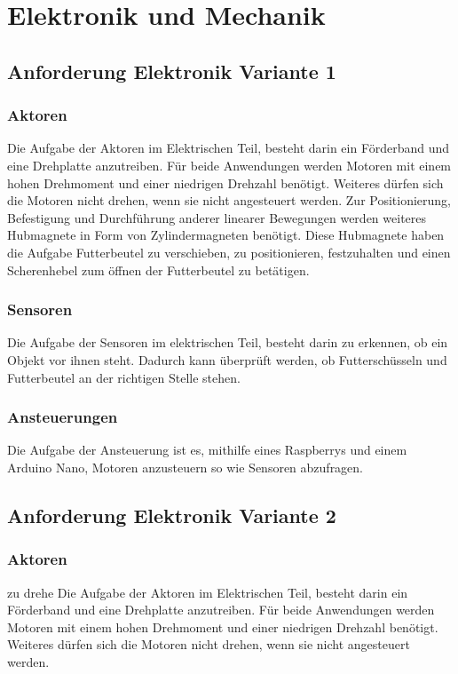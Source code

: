 \chapter{Elektronik und Mechanik}
\label{sec:elektronik-und-mechanik}

\section{Anforderung Elektronik Variante 1}
\subsection{Aktoren}
Die Aufgabe der Aktoren im Elektrischen Teil, besteht darin ein Förderband und eine Drehplatte anzutreiben. Für beide Anwendungen werden Motoren mit einem hohen Drehmoment und einer niedrigen Drehzahl benötigt. Weiteres dürfen sich die Motoren nicht drehen, wenn sie nicht angesteuert werden.
Zur Positionierung, Befestigung und Durchführung anderer linearer Bewegungen werden weiteres Hubmagnete in Form von Zylindermagneten benötigt. Diese Hubmagnete haben die Aufgabe Futterbeutel zu verschieben, zu positionieren, festzuhalten und einen Scherenhebel zum öffnen der Futterbeutel zu betätigen.  
\subsection{Sensoren}
Die Aufgabe der Sensoren im elektrischen Teil, besteht darin zu erkennen, ob ein Objekt vor ihnen steht. Dadurch kann überprüft werden, ob Futterschüsseln und Futterbeutel an der richtigen Stelle stehen.
\subsection{Ansteuerungen}
Die Aufgabe der Ansteuerung ist es, mithilfe eines Raspberrys und einem Arduino Nano, Motoren anzusteuern so wie Sensoren abzufragen. 

\section{Anforderung Elektronik Variante 2}
\subsection{Aktoren}zu drehe
Die Aufgabe der Aktoren im Elektrischen Teil, besteht darin ein Förderband und eine Drehplatte anzutreiben. Für beide Anwendungen werden Motoren mit einem hohen Drehmoment und einer niedrigen Drehzahl benötigt. Weiteres dürfen sich die Motoren nicht drehen, wenn sie nicht angesteuert werden.
